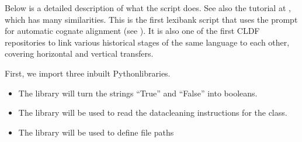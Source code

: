 \documentclass[letterpaper,10pt,english]{sphinxmanual}
\begin{document}
\sphinxAtStartPar
Below is a detailed description of what the script does. See also the
tutorial at , which has many similarities.
This is the first lexibank script that uses the
 prompt for automatic cognate alignment
(see ).
It is also one of the first CLDF repositories to link various historical
stages of the same language to each other, covering horizontal and vertical
transfers.

\begin{sphinxVerbatim}[commandchars=\\\{\}]
 
 
 

 
   
   
       
\end{sphinxVerbatim}

\sphinxAtStartPar
First, we import three inbuilt Python\sphinxhyphen{}libraries.
\begin{itemize}
\item {} 
\sphinxAtStartPar
The  library will turn
the strings “True” and “False” into booleans.

\item {} 
\sphinxAtStartPar
The  library
will be used to read the data\sphinxhyphen{}cleaning instructions for the
 class.

\item {} 
\sphinxAtStartPar
The  library
will be used to define file paths

\end{itemize}
\end{document}
